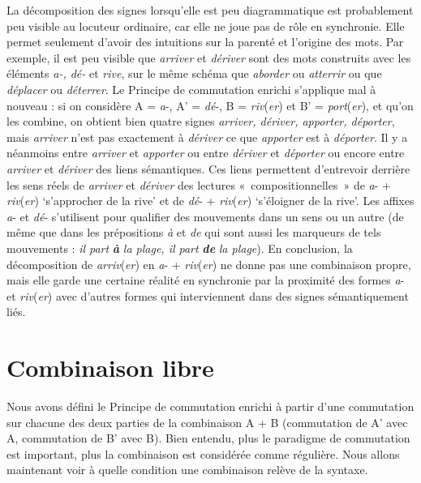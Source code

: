 La décomposition des signes lorsqu’elle est peu diagrammatique est probablement peu visible au locuteur ordinaire, car elle ne joue pas de rôle en synchronie. Elle permet seulement d’avoir des intuitions sur la parenté et l’origine des mots. Par exemple, il est peu visible que \textit{arriver} et \textit{dériver} sont des mots construits avec les éléments \textit{a-, dé-} et \textit{rive}, sur le même schéma que \textit{aborder} ou \textit{atterrir} ou que \textit{déplacer} ou \textit{déterrer}. Le Principe de commutation enrichi s’applique mal à nouveau : si on considère A = \textit{a}{}-, A’ = \textit{dé}{}-, B = \textit{riv}(\textit{er}) et B’ = \textit{port}(\textit{er}), et qu’on les combine, on obtient bien quatre signes \textit{arriver, dériver, apporter, déporter}, mais \textit{arriver} n’est pas exactement à \textit{dériver} ce que \textit{apporter} est à \textit{déporter}. Il y a néanmoins entre \textit{arriver} et \textit{apporter} ou entre \textit{dériver} et \textit{déporter} ou encore entre \textit{arriver} et \textit{dériver} des liens sémantiques. Ces liens permettent d’entrevoir derrière les sens réels de \textit{arriver} et \textit{dériver} des lectures «~compositionnelles~» de \textit{a}{}- + \textit{riv}(\textit{er}) ‘s’approcher de la rive’ et de \textit{dé}{}- + \textit{riv}(\textit{er}) ‘s’éloigner de la rive’. Les affixes \textit{a}{}- et \textit{dé}{}- s’utilisent pour qualifier des mouvements dans un sens ou un autre (de même que dans les prépositions \textit{à} et \textit{de} qui sont aussi les marqueurs de tels mouvements : \textit{il part} \textbf{\textit{à}} \textit{la plage, il part} \textbf{\textit{de}} \textit{la plage}). En conclusion, la décomposition de \textit{arriv}(\textit{er}) en \textit{a}{}- + \textit{riv}(\textit{er}) ne donne pas une combinaison propre, mais elle garde une certaine réalité en synchronie par la proximité des formes \textit{a}{}- et \textit{riv}(\textit{er}) avec d’autres formes qui interviennent dans des signes sémantiquement liés.

\section{Combinaison libre}\label{sec:2.2.5}

Nous avons défini le Principe de commutation enrichi à partir d’une commutation sur chacune des deux parties de la combinaison A + B (commutation de A’ avec A, commutation de B’ avec B). Bien entendu, plus le paradigme de commutation est important, plus la combinaison est considérée comme régulière. Nous allons maintenant voir à quelle condition une combinaison relève de la syntaxe.

